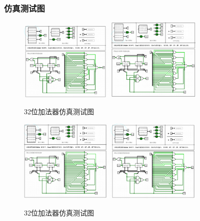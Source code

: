 \documentclass{article}
\begin{document}
    \subsubsection{仿真测试图}
    \begin{figure}[H]
    \centering
    \includegraphics[width=0.4\textwidth]{4.5.1.png}
    \includegraphics[width=0.4\textwidth]{4.5.2.png}
    \caption{32位加法器仿真测试图}
    \end{figure}

    \begin{figure}[H]
    \centering
    \includegraphics[width=0.4\textwidth]{4.5.3.png}
    \includegraphics[width=0.4\textwidth]{4.5.4.png}
    \caption{32位加法器仿真测试图}
    \end{figure}
\end{document}
